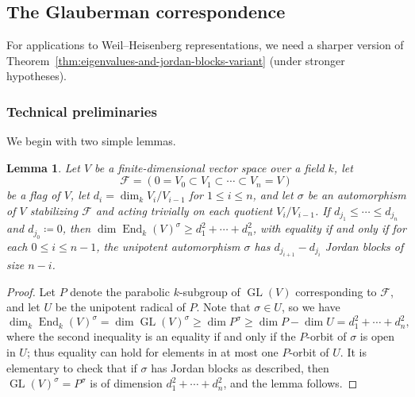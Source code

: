 \documentclass[reqno]{amsart}
\numberwithin{equation}{subsection}
\newcommand\cF{\mathcal{F}}
\DeclareMathOperator{\GL}{GL}
\DeclareMathOperator{\End}{End}
\newtheorem{lemma}[thm]{Lemma}
\theoremstyle{remark}
\numberwithin{equation}{subsection}
\numberwithin{figure}{subsection}
\begin{document}
\subsection{The Glauberman correspondence}\label{ss:glauberman}

For applications to Weil--Heisenberg representations, we need a sharper version of Theorem~\ref{thm:eigenvalues-and-jordan-blocks-variant} (under stronger hypotheses). 


\subsubsection{Technical preliminaries} We begin with two simple lemmas.

\begin{lemma}\label{lemma:maximal-jordan-blocks}
    Let $V$ be a finite-dimensional vector space over a field $k$, let 
    \[
    \cF = (0 = V_0 \subset V_1 \subset \cdots \subset V_n = V)
    \]
    be a flag of $V$, let $d_i = \dim_k V_i/V_{i-1}$ for $1 \leq i \leq n$, and let $\sigma$ be an automorphism of $V$ stabilizing $\cF$ and acting trivially on each quotient $V_i/V_{i-1}$. If $d_{j_1} \leq \cdots \leq d_{j_n}$ and $d_{j_0} \coloneqq 0$, then $\dim \End_k(V)^\sigma \geq d_1^2 + \cdots + d_n^2$, with equality if and only if for each $0 \leq i \leq n - 1$, the unipotent automorphism $\sigma$ has $d_{j_{i+1}} - d_{j_i}$ Jordan blocks of size $n - i$.
\end{lemma}

\begin{proof}
    Let $P$ denote the parabolic $k$-subgroup of $\GL(V)$ corresponding to $\cF$, and let $U$ be the unipotent radical of $P$. Note that $\sigma \in U$, so we have
    \[
    \dim_k \End_k(V)^\sigma = \dim \GL(V)^\sigma \geq \dim P^\sigma \geq \dim P - \dim U = d_1^2 + \cdots + d_n^2,
    \]
    where the second inequality is an equality if and only if the $P$-orbit of $\sigma$ is open in $U$; thus equality can hold for elements in at most one $P$-orbit of $U$. It is elementary to check that if $\sigma$ has Jordan blocks as described, then $\GL(V)^\sigma = P^\sigma$ is of dimension $d_1^2 + \cdots + d_n^2$, and the lemma follows.
\end{proof}
\end{document}
